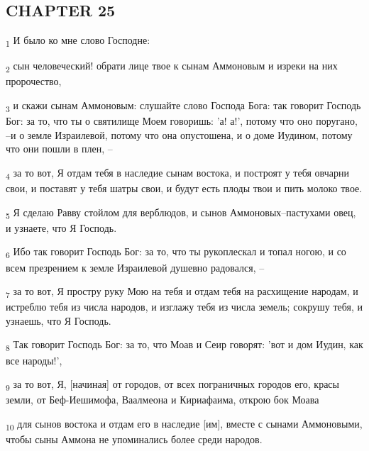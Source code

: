 \subsection{CHAPTER 25}
\begin{tcolorbox}
\textsubscript{1} И было ко мне слово Господне:
\end{tcolorbox}
\begin{tcolorbox}
\textsubscript{2} сын человеческий! обрати лице твое к сынам Аммоновым и изреки на них пророчество,
\end{tcolorbox}
\begin{tcolorbox}
\textsubscript{3} и скажи сынам Аммоновым: слушайте слово Господа Бога: так говорит Господь Бог: за то, что ты о святилище Моем говоришь: 'а! а!', потому что оно поругано, --и о земле Израилевой, потому что она опустошена, и о доме Иудином, потому что они пошли в плен, --
\end{tcolorbox}
\begin{tcolorbox}
\textsubscript{4} за то вот, Я отдам тебя в наследие сынам востока, и построят у тебя овчарни свои, и поставят у тебя шатры свои, и будут есть плоды твои и пить молоко твое.
\end{tcolorbox}
\begin{tcolorbox}
\textsubscript{5} Я сделаю Равву стойлом для верблюдов, и сынов Аммоновых--пастухами овец, и узнаете, что Я Господь.
\end{tcolorbox}
\begin{tcolorbox}
\textsubscript{6} Ибо так говорит Господь Бог: за то, что ты рукоплескал и топал ногою, и со всем презрением к земле Израилевой душевно радовался, --
\end{tcolorbox}
\begin{tcolorbox}
\textsubscript{7} за то вот, Я простру руку Мою на тебя и отдам тебя на расхищение народам, и истреблю тебя из числа народов, и изглажу тебя из числа земель; сокрушу тебя, и узнаешь, что Я Господь.
\end{tcolorbox}
\begin{tcolorbox}
\textsubscript{8} Так говорит Господь Бог: за то, что Моав и Сеир говорят: 'вот и дом Иудин, как все народы!',
\end{tcolorbox}
\begin{tcolorbox}
\textsubscript{9} за то вот, Я, [начиная] от городов, от всех пограничных городов его, красы земли, от Беф-Иешимофа, Ваалмеона и Кириафаима, открою бок Моава
\end{tcolorbox}
\begin{tcolorbox}
\textsubscript{10} для сынов востока и отдам его в наследие [им], вместе с сынами Аммоновыми, чтобы сыны Аммона не упоминались более среди народов.
\end{tcolorbox}
